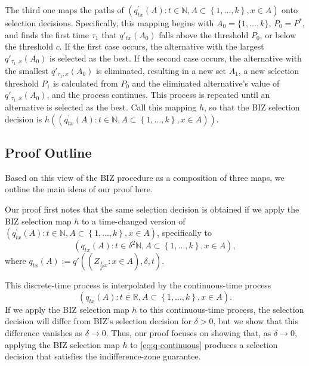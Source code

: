 \documentclass{wscpaperproc}
\theoremstyle{wsc}
\begin{document}
The third one maps the paths of $\left(q_{tx}^{'}\left(A\right):t\in\mathbb{N},A\subset\left\{ 1,\ldots,k\right\} ,x\in A\right)$
onto selection decisions. Specifically, this mapping begins with $A_0 = \{1,\ldots,k\}$,
$P_0=P^*$, 
and finds the first time $\tau_1$ that $q'_{tx}(A_0)$ falls above the threshold $P_0$,
or below the threshold $c$.
If the first case occurs, the alternative with the largest $q'_{\tau_1,x}(A_0)$ is selected as the best.
If the second case occurs, the alternative with the smallest
$q'_{\tau_1,x}(A_0)$ is eliminated, resulting in a new set $A_1$, a new selection threshold 
$P_1$ is calculated from $P_0$ and the eliminated alternative's value of $q'_{\tau_1,x}(A_0)$, and the process continues.
This process is repeated until an alternative is selected as the best.
Call this mapping $h$, so that the BIZ selection decision is
$h\left(\left(q_{tx}^{'}\left(A\right):t\in\mathbb{N},A\subset\left\{ 1,\ldots,k\right\} ,x\in A\right)\right)$.

\subsection{Proof Outline}
Based on this view of the BIZ procedure as a composition of three maps, we outline the main ideas of our proof here. 

Our proof first notes that the same selection decision is obtained if we apply
the BIZ selection map $h$ to a time-changed version of 
$\left(q_{tx}^{'}\left(A\right):t\in\mathbb{N},A\subset\left\{ 1,\ldots,k\right\} ,x\in A\right)$, specifically to 
\begin{equation*}
\left(q_{tx}\left(A\right):t\in\delta^2 \mathbb{N},A\subset\left\{ 1,\ldots,k\right\} ,x\in A\right),
\end{equation*}
where
$q_{tx}\left(A\right) := q'\left(\left(Z_{\frac{t}{\delta^{2}}x}:x\in A\right),\delta,t \right)$.

This discrete-time process is interpolated by the continuous-time process 
\begin{equation}
\left(q_{tx}\left(A\right):t\in\mathbb{R},A\subset\left\{ 1,\ldots,k\right\} ,x\in A\right).
\label{eq:q-continuous}
\end{equation}
If we apply the BIZ selection map $h$ to this continuous-time process, the selection decision will differ from BIZ's selection decision for $\delta>0$, but we show that this difference vanishes as $\delta\to0$.  Thus, our proof focuses on showing that, as $\delta\to0$, applying the BIZ selection map $h$ to \eqref{eq:q-continuous} produces a selection decision that satisfies the indifference-zone guarantee. 
\end{document}
